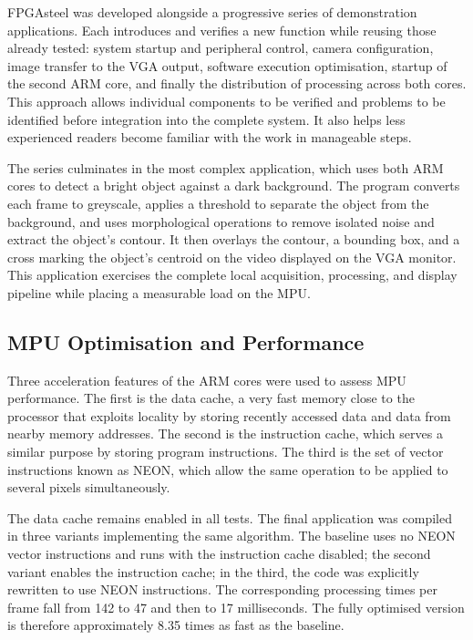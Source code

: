 FPGAsteel was developed alongside a progressive series of demonstration applications. Each introduces and verifies a new function while reusing those already tested: system startup and peripheral control, camera configuration, image transfer to the VGA output, software execution optimisation, startup of the second ARM core, and finally the distribution of processing across both cores. This approach allows individual components to be verified and problems to be identified before integration into the complete system. It also helps less experienced readers become familiar with the work in manageable steps.

The series culminates in the most complex application, which uses both ARM cores to detect a bright object against a dark background. The program converts each frame to greyscale, applies a threshold to separate the object from the background, and uses morphological operations to remove isolated noise and extract the object's contour. It then overlays the contour, a bounding box, and a cross marking the object's centroid on the video displayed on the VGA monitor. This application exercises the complete local acquisition, processing, and display pipeline while placing a measurable load on the MPU.

\subsection{MPU Optimisation and Performance}

Three acceleration features of the ARM cores were used to assess MPU performance. The first is the data cache, a very fast memory close to the processor that exploits locality by storing recently accessed data and data from nearby memory addresses. The second is the instruction cache, which serves a similar purpose by storing program instructions. The third is the set of vector instructions known as NEON, which allow the same operation to be applied to several pixels simultaneously.

The data cache remains enabled in all tests. The final application was compiled in three variants implementing the same algorithm. The baseline uses no NEON vector instructions and runs with the instruction cache disabled; the second variant enables the instruction cache; in the third, the code was explicitly rewritten to use NEON instructions. The corresponding processing times per frame fall from 142 to 47 and then to 17 milliseconds. The fully optimised version is therefore approximately 8.35 times as fast as the baseline.


